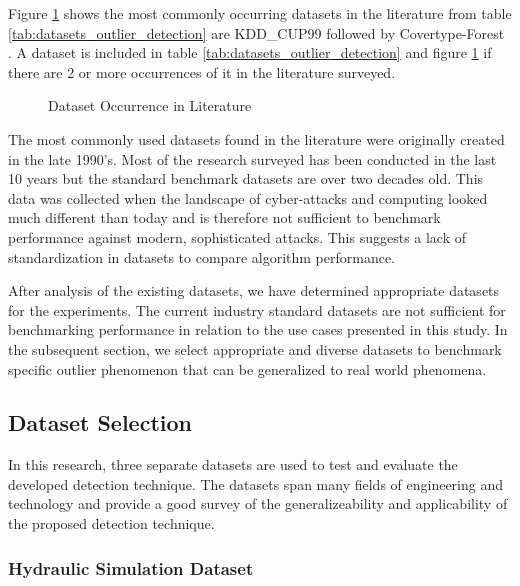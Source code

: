 

Figure \ref{fig_dataset_lit} shows the most commonly occurring datasets in the literature from table \ref{tab:datasets_outlier_detection} are KDD\_CUP99 \parencite{kdd1999} followed by Covertype-Forest \parencite{covertype-dataset}. A dataset is included in table \ref{tab:datasets_outlier_detection} and figure \ref{fig_dataset_lit} if there are 2 or more occurrences of it in the literature surveyed.

\begin{figure}[H]
    \caption{Dataset Occurrence in Literature }
    \label{fig_dataset_lit}
\end{figure}


The most commonly used datasets found in the literature were originally created in the late 1990's. Most of the research surveyed has been conducted in the last 10 years but the standard benchmark datasets are over two decades old. This data was collected when the landscape of cyber-attacks and computing looked much different than today and is therefore not sufficient to benchmark performance against modern, sophisticated attacks. This suggests a lack of standardization in datasets to compare algorithm performance.

After analysis of the existing datasets, we have determined appropriate datasets for the experiments. The current industry standard datasets are not sufficient for benchmarking performance in relation to the use cases presented in this study. In the subsequent section, we select appropriate and diverse datasets to benchmark specific outlier phenomenon that can be generalized to real world phenomena.

\subsection{Dataset Selection}
\label{ref_datasets}

In this research, three separate datasets are used to test and evaluate the developed detection technique. The datasets span many fields of engineering and technology and provide a good survey of the generalizeability and applicability of the proposed detection technique.

\subsubsection{Hydraulic Simulation Dataset}
\label{ref_hydraulic_dataset}

